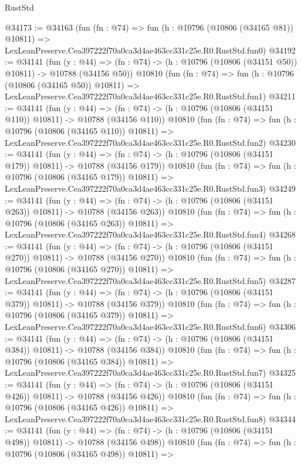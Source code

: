 \begin{lexlean}{RustStd}
\begin{coremodule}
@34173 := @34163
    (fun (fn : @74) =>
    fun (h : @10796 (@10806 (@34165 @81)) @10811) =>
    LexLeanPreserve.Cea397222f70a0ca3d4ae463cc331c25e.R0.RustStd.fun0)
@34192 := @34141
    (fun (y : @44) =>
    (fn : @74) -> (h : @10796 (@10806 (@34151 @50)) @10811) -> @10788 (@34156 @50))
    @10810
    (fun (fn : @74) =>
    fun (h : @10796 (@10806 (@34165 @50)) @10811) =>
    LexLeanPreserve.Cea397222f70a0ca3d4ae463cc331c25e.R0.RustStd.fun1)
@34211 := @34141
    (fun (y : @44) =>
    (fn : @74) -> (h : @10796 (@10806 (@34151 @110)) @10811) -> @10788 (@34156 @110))
    @10810
    (fun (fn : @74) =>
    fun (h : @10796 (@10806 (@34165 @110)) @10811) =>
    LexLeanPreserve.Cea397222f70a0ca3d4ae463cc331c25e.R0.RustStd.fun2)
@34230 := @34141
    (fun (y : @44) =>
    (fn : @74) -> (h : @10796 (@10806 (@34151 @179)) @10811) -> @10788 (@34156 @179))
    @10810
    (fun (fn : @74) =>
    fun (h : @10796 (@10806 (@34165 @179)) @10811) =>
    LexLeanPreserve.Cea397222f70a0ca3d4ae463cc331c25e.R0.RustStd.fun3)
@34249 := @34141
    (fun (y : @44) =>
    (fn : @74) -> (h : @10796 (@10806 (@34151 @263)) @10811) -> @10788 (@34156 @263))
    @10810
    (fun (fn : @74) =>
    fun (h : @10796 (@10806 (@34165 @263)) @10811) =>
    LexLeanPreserve.Cea397222f70a0ca3d4ae463cc331c25e.R0.RustStd.fun4)
@34268 := @34141
    (fun (y : @44) =>
    (fn : @74) -> (h : @10796 (@10806 (@34151 @270)) @10811) -> @10788 (@34156 @270))
    @10810
    (fun (fn : @74) =>
    fun (h : @10796 (@10806 (@34165 @270)) @10811) =>
    LexLeanPreserve.Cea397222f70a0ca3d4ae463cc331c25e.R0.RustStd.fun5)
@34287 := @34141
    (fun (y : @44) =>
    (fn : @74) -> (h : @10796 (@10806 (@34151 @379)) @10811) -> @10788 (@34156 @379))
    @10810
    (fun (fn : @74) =>
    fun (h : @10796 (@10806 (@34165 @379)) @10811) =>
    LexLeanPreserve.Cea397222f70a0ca3d4ae463cc331c25e.R0.RustStd.fun6)
@34306 := @34141
    (fun (y : @44) =>
    (fn : @74) -> (h : @10796 (@10806 (@34151 @384)) @10811) -> @10788 (@34156 @384))
    @10810
    (fun (fn : @74) =>
    fun (h : @10796 (@10806 (@34165 @384)) @10811) =>
    LexLeanPreserve.Cea397222f70a0ca3d4ae463cc331c25e.R0.RustStd.fun7)
@34325 := @34141
    (fun (y : @44) =>
    (fn : @74) -> (h : @10796 (@10806 (@34151 @426)) @10811) -> @10788 (@34156 @426))
    @10810
    (fun (fn : @74) =>
    fun (h : @10796 (@10806 (@34165 @426)) @10811) =>
    LexLeanPreserve.Cea397222f70a0ca3d4ae463cc331c25e.R0.RustStd.fun8)
@34344 := @34141
    (fun (y : @44) =>
    (fn : @74) -> (h : @10796 (@10806 (@34151 @498)) @10811) -> @10788 (@34156 @498))
    @10810
    (fun (fn : @74) =>
    fun (h : @10796 (@10806 (@34165 @498)) @10811) =>

\end{coremodule}
\end{lexlean}
